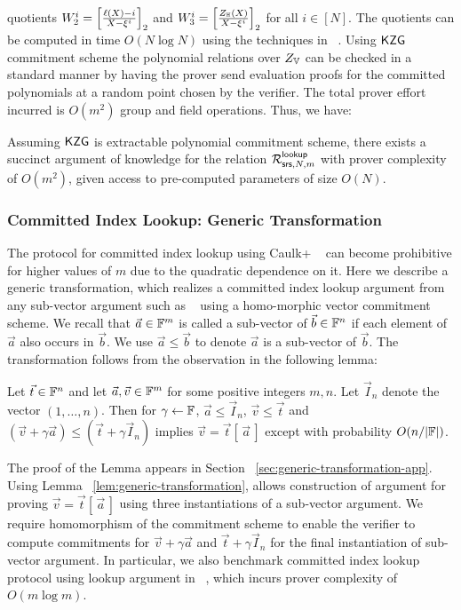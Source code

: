 quotients $W_2^i=\left[{\frac{\ell(X) - i}{X-\xi^i}}\right]_2$ and $W_3^i=\left[{\frac{Z_\mathbb{H}(X)}{X-\xi^i}}\right]_2$ for all $i\in [N]$.
The quotients can be computed in time $O(N\log N)$ using the techniques in ~\cite{EPRINT:FeiKho23}. Using $\mathsf{KZG}$ commitment
scheme the polynomial relations over $Z_{\mathbb{V}}$ can be checked in a standard manner
by having the prover send evaluation proofs for the committed polynomials at a random point chosen by the verifier.
The total prover effort incurred is $O(m^2)$ group and field operations.
Thus, we have:
\begin{lemma}\label{lem:comm-index-lookup}
Assuming $\mathsf{KZG}$ is extractable polynomial commitment scheme, there exists a succinct argument of knowledge for
the relation $\mathcal{R}^{\mathsf{lookup}}_{\mathsf{srs},N,m}$ with prover complexity of $O(m^2)$, given access to pre-computed parameters of size $O(N)$.
\end{lemma}

\subsubsection{Committed Index Lookup: Generic Transformation}\label{subsubsec:generic-transformation}
The protocol for committed index lookup using Caulk+ ~\cite{EPRINT:PosKat22} can become prohibitive for higher values of
$m$ due to the quadratic dependence on it. Here we describe a generic transformation, which realizes a committed index lookup
argument from any sub-vector argument such as ~\cite{CCS:ZBKMNS22,EPRINT:PosKat22,EPRINT:ZGKMR22,EPRINT:EagFioGab22} using a homo-morphic
vector commitment scheme. We recall that $\vec{a}\in \mathbb{F}^m$ is called a sub-vector of $\vec{b}\in \mathbb{F}^n$ if each element of $\vec{a}$
also occurs in $\vec{b}$. We use $\vec{a}\leq \vec{b}$ to denote $\vec{a}$ is a sub-vector of $\vec{b}$.
The transformation follows from the observation in the following lemma:
\begin{lemma}\label{lem:generic-transformation}
Let $\vec{t}\in \mathbb{F}^n$ and let $\vec{a},\vec{v}\in \mathbb{F}^m$ for some positive integers $m,n$. Let $\vec{I}_n$ denote the vector $(1,\ldots,n)$.
Then for $\gamma\gets \mathbb{F}$, $\vec{a}\leq \vec{I}_n$, $\vec{v}\leq \vec{t}$ and $(\vec{v}+\gamma \vec{a})\leq (\vec{t} + \gamma \vec{I}_n)$ implies
$\vec{v}=\vec{t}[\,\vec{a}\,]$ except with probability $O(n/|\mathbb{F}|)$.
\end{lemma}
The proof of the Lemma appears in Section ~\ref{sec:generic-transformation-app}.
Using Lemma ~\ref{lem:generic-transformation}, allows construction of argument for proving $\vec{v}=\vec{t}[\,\vec{a}\,]$ using three instantiations
of a sub-vector argument. We require homomorphism of the commitment scheme to enable the verifier to compute commitments for $\vec{v}+\gamma \vec{a}$ and
$\vec{t} + \gamma \vec{I}_n$ for the final instantiation of sub-vector argument. In particular, we also benchmark committed index lookup
protocol using lookup argument in ~\cite{EPRINT:EagFioGab22}, which incurs prover complexity of $O(m\log m)$.
~

